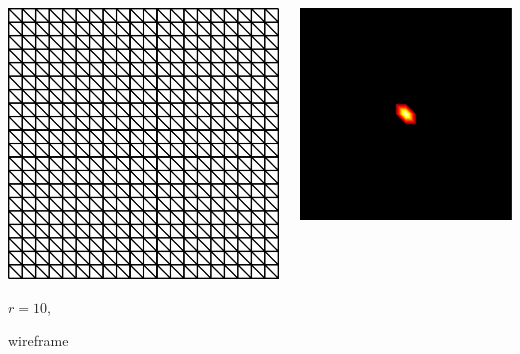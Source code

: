 \documentclass[aspectratio=169,t]{beamer}
\begin{document}
{\begin{columns}
\begin{column}{0.22\textwidth}
			\includegraphics[width=.85\textwidth]{data/synthetic_meshes/square_tesselation_2tri_Dirac_delta_10_v441_f800_wireframe.png}
			{\footnotesize
				\par \vspace{-1mm} $r=10$,
				\par \vspace{-1mm} wireframe
			}
		\end{column}
		\begin{column}{0.22\textwidth}
			\centering
			\includegraphics[width=.85\textwidth]{data/synthetic_meshes/square_tesselation_2tri_Dirac_delta_10_v441_f800_funcvals_0iter.png}

\end{column}
\end{columns}}
\end{document}
